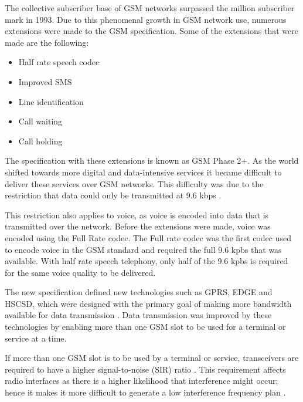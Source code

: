 The collective subscriber base of GSM networks surpassed the million subscriber mark in 1993. Due to this phenomenal growth in GSM network use, numerous extensions were made to the GSM specification. 
Some of the extensions that were made are the following\cite{GSM92,GSMArchitectureProtocolsServices}:
\begin{itemize}
\item Half rate speech codec
\item Improved SMS
\item Line identification
\item Call waiting
\item Call holding
\end{itemize}
The specification with these extensions is known as GSM Phase 2+. As the world shifted towards more digital and data-intensive services it became difficult to deliver these services over GSM networks. This difficulty was due to the restriction that data could only be transmitted at 9.6 kbps \cite{GSM92,Karen2004}. 

This restriction also applies to voice, as voice is encoded into data that is transmitted over the network\cite{Karen2004, GSM92}. Before the extensions were made, voice was encoded using the Full Rate codec\cite{GSMArchitectureProtocolsServices}. The Full rate codec was the first codec used to encode voice in the GSM standard and required the full 9.6 kpbs that was available\cite{GSMArchitectureProtocolsServices}. With half rate speech telephony, only half of the 9.6 kpbs is required for the same voice quality to be delivered\cite{GSMArchitectureProtocolsServices}.  

The new specification defined new technologies such as GPRS, EDGE and HSCSD, which were designed with the primary goal of making more bandwidth available for data transmission \cite{GSMArchitectureProtocolsServices,Karen2004}. Data transmission was improved by these technologies by enabling more than one GSM slot to be used for a terminal or service at a time\cite{GSMArchitectureProtocolsServices,Karen2004}.

If more than one GSM slot is to be used by a terminal or service, transceivers are required to have a higher signal-to-noise (SIR) ratio \cite{GSMArchitectureProtocolsServices,GSMSysEngin}. This requirement affects radio interfaces as there is a higher likelihood that interference might occur; hence it makes it more difficult to generate a low interference frequency plan \cite{Eisenblatter,GSMSysEngin}. 

